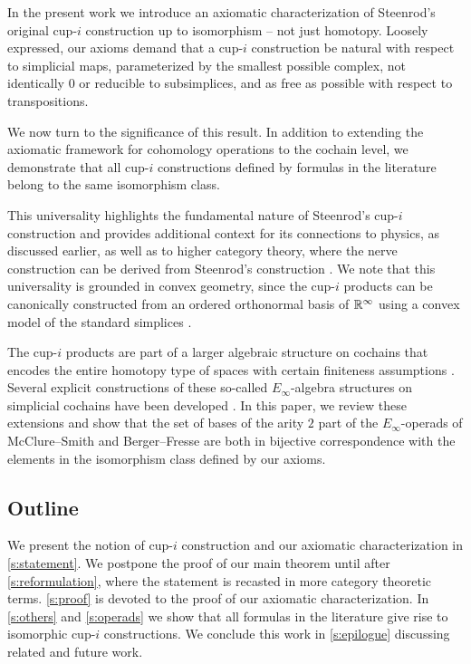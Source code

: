 In the present work we introduce an axiomatic characterization of Steenrod's original cup-$i$ construction up to isomorphism -- not just homotopy.
Loosely expressed, our axioms demand that a cup-$i$ construction be natural with respect to simplicial maps, parameterized by the smallest possible complex, not identically $0$ or reducible to subsimplices, and as free as possible with respect to transpositions.

We now turn to the significance of this result.
In addition to extending the axiomatic framework for cohomology operations \cite{serre1053eilenberg_maclane, cartan1955iteration, steenrod1962cohomology} to the cochain level, we demonstrate that all cup-$i$ constructions defined by formulas in the literature \cite{steenrod1947products, real1996computability, mcclure2003multivariable, berger2004combinatorial, medina2020prop1, medina2023fast_sq} belong to the same isomorphism class.

This universality highlights the fundamental nature of Steenrod's cup-$i$ construction and provides additional context for its connections to physics, as discussed earlier, as well as to higher category theory, where the nerve construction can be derived from Steenrod's construction \cite{street1987orientals, medina2020globular}.
We note that this universality is grounded in convex geometry, since the cup-$i$ products can be canonically constructed from an ordered orthonormal basis of $\mathbb{R}^\infty$ using a convex model of the standard simplices \cite{medina2022fib_poly}.

The cup-$i$ products are part of a larger algebraic structure on cochains that encodes the entire homotopy type of spaces with certain finiteness assumptions \cite{mandell2006homotopy_type}.
Several explicit constructions of these so-called $E_\infty$-algebra structures on simplicial cochains have been developed \cite{mcclure2003multivariable, berger2004combinatorial, medina2020prop1}.
In this paper, we review these extensions and show that the set of bases of the arity $2$ part of the $E_\infty$-operads of McClure--Smith and Berger--Fresse are both in bijective correspondence with the elements in the isomorphism class defined by our axioms.

\subsection*{Outline}

We present the notion of cup-$i$ construction and our axiomatic characterization in \cref{s:statement}.
We postpone the proof of our main theorem until after \cref{s:reformulation}, where the statement is recasted in more category theoretic terms.
\cref{s:proof} is devoted to the proof of our axiomatic characterization.
In \cref{s:others} and \cref{s:operads} we show that all formulas in the literature give rise to isomorphic \mbox{cup-$i$} constructions.
We conclude this work in \cref{s:epilogue} discussing related and future work.